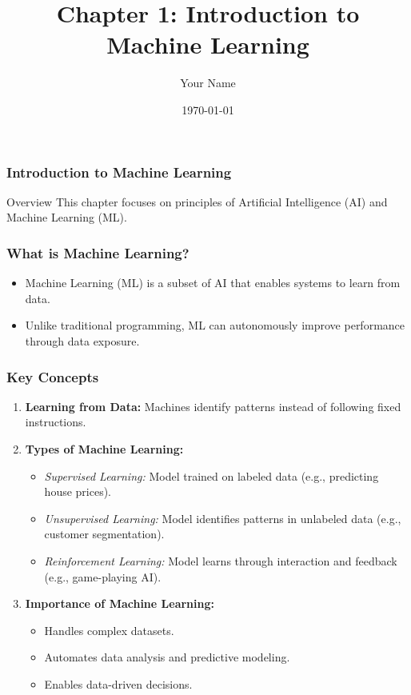\documentclass[aspectratio=169]{beamer}
\title[Machine Learning Intro]{Chapter 1: Introduction to Machine Learning}
\author[Your Name]{Your Name}
\institute[Your Institution]{Your Title\\ Your Institution}
\date{\today}
\begin{document}
\frame{\titlepage}

\begin{frame}[fragile]
    \frametitle{Introduction to Machine Learning}
    \begin{block}{Overview}
        This chapter focuses on principles of Artificial Intelligence (AI) and Machine Learning (ML).
    \end{block}
\end{frame}

\begin{frame}[fragile]
    \frametitle{What is Machine Learning?}
    \begin{itemize}
        \item Machine Learning (ML) is a subset of AI that enables systems to learn from data.
        \item Unlike traditional programming, ML can autonomously improve performance through data exposure.
    \end{itemize}
\end{frame}

\begin{frame}[fragile]
    \frametitle{Key Concepts}
    \begin{enumerate}
        \item \textbf{Learning from Data:} Machines identify patterns instead of following fixed instructions.
        \item \textbf{Types of Machine Learning:}
        \begin{itemize}
            \item \textit{Supervised Learning:} Model trained on labeled data (e.g., predicting house prices).
            \item \textit{Unsupervised Learning:} Model identifies patterns in unlabeled data (e.g., customer segmentation).
            \item \textit{Reinforcement Learning:} Model learns through interaction and feedback (e.g., game-playing AI).
        \end{itemize}
        \item \textbf{Importance of Machine Learning:}
        \begin{itemize}
            \item Handles complex datasets.
            \item Automates data analysis and predictive modeling.
            \item Enables data-driven decisions.
        \end{itemize}
    \end{enumerate}
\end{frame}
\end{document}
